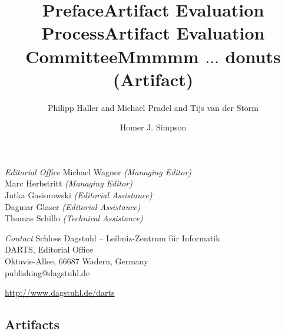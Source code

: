 \documentclass[a4paper,UKenglish]{dartsmaster}
\begin{document}
\begin{publicationinfo}


\vfill


\emph{Editorial Office}\newline
Michael Wagner \emph{(Managing Editor)}\\
Marc Herbstritt \emph{(Managing Editor)}\\
Jutka Gasiorowski \emph{(Editorial Assistance)}\\
Dagmar Glaser \emph{(Editorial Assistance)}\\
Thomas Schillo \emph{(Technical Assistance)}

\bigskip
\emph{Contact}\newline
Schloss Dagstuhl -- Leibniz-Zentrum f\"ur Informatik\\
DARTS, Editorial Office\\
Oktavie-Allee, 66687 Wadern, Germany\\ 
publishing@dagstuhl.de


\bigskip

\url{http://www.dagstuhl.de/darts}
 
 \thispagestyle{empty}
 \onecolumn

\newpage

\end{publicationinfo}




\begin{contentslist}

\contitem
\title{Preface}
\author{Philipp Haller and Michael Pradel and Tijs van der Storm}

\contitem
\title{Artifact Evaluation Process}
\author{ }

\contitem
\title{Artifact Evaluation Committee}
\author{ }

\part{Artifacts}


\contitem
\title{Mmmmm $\ldots$ donuts (Artifact)}
\author{Homer J. Simpson}


\end{contentslist}
\end{document}
